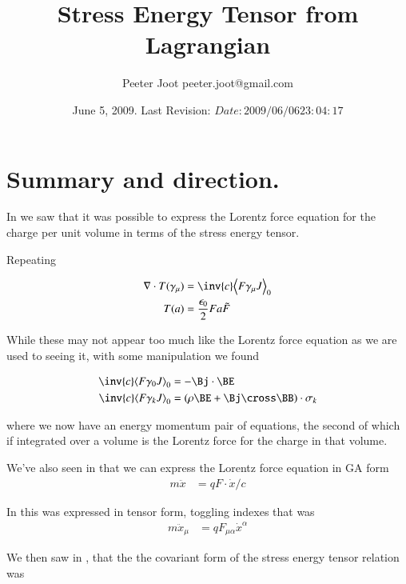 \documentclass{article}
\title{Stress Energy Tensor from Lagrangian}\label{chap:stress_energy_noethers}
\author{Peeter Joot \quad peeter.joot@gmail.com }
\date{ June 5, 2009.  Last Revision: $Date: 2009/06/06 23:04:17 $ }
\begin{document}
\maketitle{}
\tableofcontents
\section{ Summary and direction. }

In 
\cite{PJstressEnergyLorentz} 
we saw that it was
possible to express the Lorentz force equation for the charge per unit
volume in terms of the stress energy tensor.

Repeating 

\begin{align}
\grad \cdot T(\gamma_\mu) &= \inv{c} \gpgradezero{ F \gamma_\mu J } \\
T(a) &= \frac{\epsilon_0}{2} F a \tilde{F}
\end{align}

While these
may not appear too much like the Lorentz force equation as we are used
to seeing it, with some manipulation we found 

\begin{align}
\inv{c} \gpgradezero{ F \gamma_0 J } &= -\Bj \cdot \BE \\
\inv{c} \gpgradezero{ F \gamma_k J } &= (\rho \BE + \Bj \cross \BB) \cdot \sigma_k
\end{align}

where we now have an energy momentum pair of equations, the second
of which if integrated over a volume is the Lorentz force for the charge
in that volume.

We've also seen in
that we can express the Lorentz force equation in GA form
\begin{align}
m \ddot{x} &= q F \cdot \dot{x}/c
\end{align}

In 
this was expressed in tensor form, toggling indexes that was
\begin{align}
m \ddot{x}_\mu &= {q} F_{\mu\alpha} \dot{x}^\alpha
\end{align}

We then saw in
\cite{PJenMtensor}
, that the
the covariant form of the stress energy tensor relation was
\end{document}
